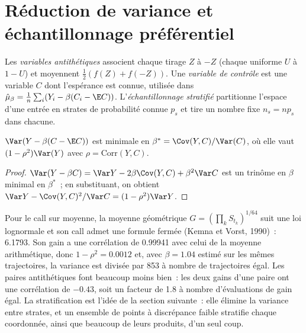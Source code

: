 \section{Réduction de variance et échantillonnage préférentiel}

\begin{definition}\label{def:qm:monte-carlo:vr}
Les \emph{variables antithétiques} associent chaque tirage $Z$ à $-Z$ (chaque uniforme $U$ à $1 - U$) et moyennent $\frac12(f(Z) + f(-Z))$. Une \emph{variable de contrôle}
est une variable $C$ dont l'espérance est connue, utilisée dans $\hat\mu_\beta = \frac1n\sum_i(Y_i - \beta(C_i - \E C))$. L'\emph{échantillonnage stratifié} partitionne l'espace d'une entrée en
strates de probabilité connue $p_s$ et tire un nombre fixe $n_s = np_s$ dans chacune.
\end{definition}

\begin{proposition}\label{prop:qm:monte-carlo:cv}
$\Var(Y - \beta(C - \E C))$ est minimale en $\beta^* = \Cov(Y, C)/\Var(C)$, où elle vaut $(1 - \rho^2)\Var(Y)$ avec $\rho = \mathrm{Corr}(Y, C)$.
\end{proposition}

\begin{proof}
$\Var(Y - \beta C) = \Var Y - 2\beta\Cov(Y, C) + \beta^2\Var C$ est un trinôme en $\beta$ minimal en $\beta^*$~; en substituant, on obtient $\Var Y - \Cov(Y, C)^2/\Var C = (1 - \rho^2)\Var Y$.
\end{proof}

Pour le call sur moyenne, la moyenne géométrique $G = (\prod_kS_{t_k})^{1/64}$ suit une loi lognormale et son call admet une formule fermée (Kemna et Vorst, 1990)~: 6.1793. Son gain a une corrélation de 0.99941 avec
celui de la moyenne arithmétique, donc $1 - \rho^2 = 0.0012$ et, avec $\beta = 1.04$ estimé sur les mêmes trajectoires, la variance est divisée par 853 à nombre de trajectoires égal. Les paires antithétiques font beaucoup moins bien~:
les deux gains d'une paire ont une corrélation de $-0.43$, soit un facteur de 1.8 à nombre d'évaluations de gain égal. La stratification est l'idée de la section suivante~: elle élimine la variance entre strates, et un
ensemble de points à discrépance faible stratifie chaque coordonnée, ainsi que beaucoup de leurs produits, d'un seul coup.


